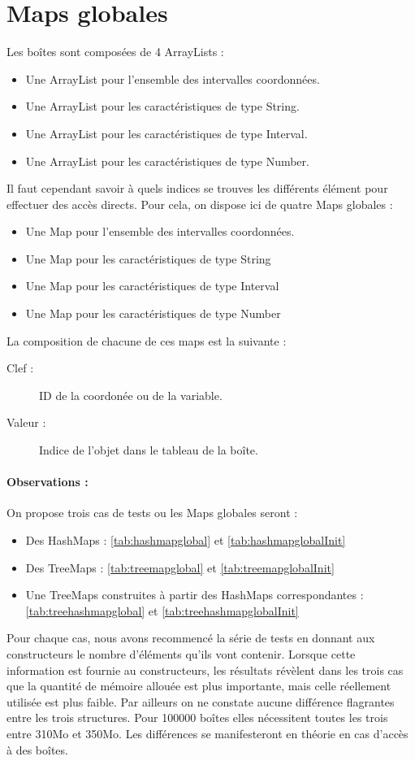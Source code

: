 \section{Maps globales}
Les boîtes sont composées  de 4 ArrayLists : 
\begin{itemize}
  \item Une ArrayList pour l'ensemble des intervalles coordonnées.
  \item Une ArrayList pour les caractéristiques de type String.
  \item Une ArrayList pour les caractéristiques de type Interval.
  \item Une ArrayList pour les caractéristiques de type Number.
\end{itemize}
Il faut cependant savoir à quels indices se trouves les différents élément pour effectuer des accès directs. Pour cela, on dispose ici de quatre Maps globales :
\begin{itemize}
  \item Une Map pour l'ensemble des intervalles coordonnées.
  \item Une Map pour les caractéristiques de type String
  \item Une Map pour les caractéristiques de type Interval
  \item Une Map pour les caractéristiques de type Number
\end{itemize}
La composition de chacune de ces maps est la suivante :  
\begin{description}
 \item[Clef :]
ID de la coordonée ou de la variable.
\item[Valeur :]
Indice de l'objet dans le tableau de la boîte.
\end{description}


\paragraph{Observations :}
On propose trois cas de tests ou les Maps globales seront :
\begin{itemize}
  \item Des HashMaps :  \ref{tab:hashmapglobal} et \ref{tab:hashmapglobalInit}
  \item Des TreeMaps :  \ref{tab:treemapglobal} et \ref{tab:treemapglobalInit}
  \item Une TreeMaps construites à partir des HashMaps correspondantes : \ref{tab:treehashmapglobal} et \ref{tab:treehashmapglobalInit}
\end{itemize}
 Pour chaque cas, nous avons recommencé la série de tests en donnant aux constructeurs le nombre d'éléments qu'ils vont contenir. Lorsque cette information est fournie au constructeurs, les résultats révèlent dans les trois cas que la quantité de mémoire allouée est plus importante, mais celle réellement utilisée est plus faible. Par ailleurs on ne constate aucune différence flagrantes entre les trois structures. Pour 100000 boîtes elles nécessitent toutes les trois entre 310Mo et 350Mo. Les différences se manifesteront en théorie  en cas d'accès à des boîtes.
 
